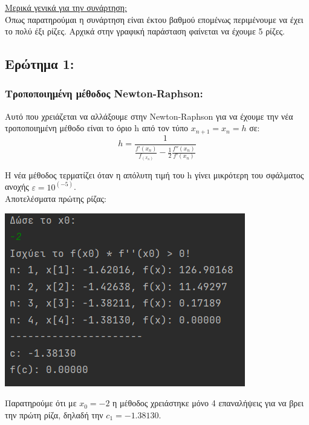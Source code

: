 \documentclass{article}
\begin{document}
\vspace{5mm} 
\large{\underline{Μερικά γενικά για την συνάρτηση: }} \\
Όπως παρατηρούμαι η συνάρτηση είναι έκτου βαθμού επομένως περιμένουμε να έχει το πολύ έξι ρίζες. Αρχικά στην γραφική παράσταση φαίνεται να έχουμε 5 ρίζες.

\subsection{Ερώτημα 1:}
    \subsubsection{Τροποποιημένη μέθοδος Newton-Raphson:}
    Αυτό που χρειάζεται να αλλάξουμε στην Newton-Raphson για να έχουμε την νέα τροποποιημένη μέθοδο είναι το όριο h από τον τύπο \(x_{n+1} = x_n = h\) σε: \\
    
    \[h = \frac{1}{\frac{f'(x_n)}{f_(x_n)} - \frac{1}{2}\frac{f''(x_n)}{f'(x_n)}}\]
    
    Η νέα μέθοδος τερματίζει όταν η απόλυτη τιμή του h γίνει μικρότερη του σφάλματος ανοχής \(ε = 10^{(-5)}\). \\
    
    Αποτελέσματα πρώτης ρίζας: \\
    \begin{center}\includegraphics[]{images/results_8.png}\end{center}
    Παρατηρούμε ότι με \(x_0 = -2\) η μέθοδος χρειάστηκε μόνο 4 επαναλήψεις για να βρει την πρώτη ρίζα, δηλαδή την \(c_1 = -1.38130\). 
    
\end{document}
